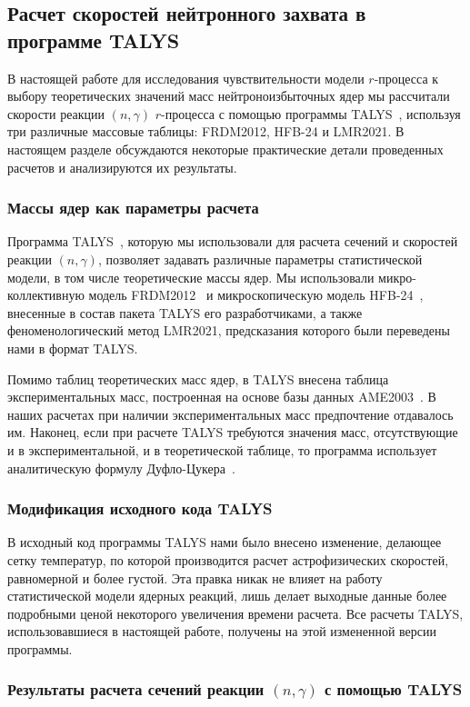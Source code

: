 \subsection{Расчет скоростей нейтронного захвата в программе TALYS}
В настоящей работе для исследования чувствительности модели $r$-процесса к выбору теоретических значений масс нейтроноизбыточных ядер мы рассчитали скорости реакции $(n,\gamma)$ $r$-процесса с помощью программы TALYS~\cite{koning2019}, используя три различные массовые таблицы: FRDM2012, HFB-24 и LMR2021. В настоящем разделе обсуждаются некоторые практические детали проведенных расчетов и анализируются их результаты.

\subsubsection{Массы ядер как параметры расчета}
Программа TALYS~\cite{koning2019}, которую мы использовали для расчета сечений и скоростей реакции $(n,\gamma)$, позволяет задавать различные параметры статистической модели, в том числе теоретические массы ядер. Мы использовали микро-коллективную модель FRDM2012~\cite{moller2016} и микроскопическую модель HFB-24~\cite{goriely2013}, внесенные в состав пакета TALYS его разработчиками, а также феноменологический метод LMR2021, предсказания которого были переведены нами в формат TALYS. 

Помимо таблиц теоретических масс ядер, в TALYS внесена таблица экспериментальных масс, построенная на основе базы данных AME2003~\cite{wapstra2003}. В наших расчетах при наличии экспериментальных масс предпочтение отдавалось им. Наконец, если при расчете TALYS требуются значения масс, отсутствующие и в экспериментальной, и в теоретической таблице, то программа использует аналитическую формулу Дуфло-Цукера~\cite{duflo1995}.

\subsubsection{Модификация исходного кода TALYS}
В исходный код программы TALYS нами было внесено изменение, делающее сетку температур, по которой производится расчет астрофизических скоростей, равномерной и более густой. Эта правка никак не влияет на работу статистической модели ядерных реакций, лишь делает выходные данные более подробными ценой некоторого увеличения времени расчета. Все расчеты TALYS, использовавшиеся в настоящей работе, получены на этой измененной версии программы.  

\subsubsection{Результаты расчета сечений реакции $(n,\gamma)$ с помощью TALYS}

